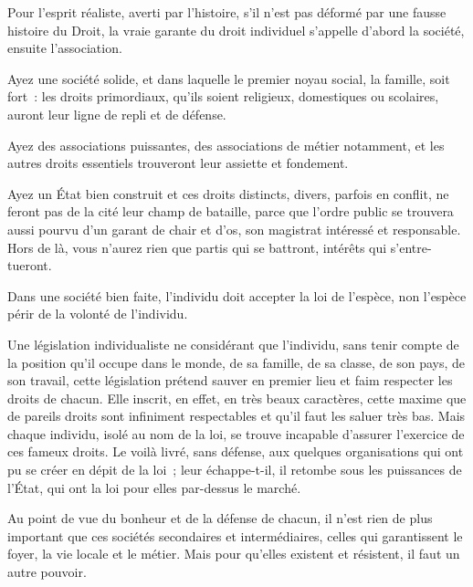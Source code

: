 \documentclass[french,twoside]{book} %
\newcommand{\astermono}{\medskip\centerline{\color{rubric}\large\selectfont{\syms ✻}}\medskip\par}%
\begin{document}
\astermono

\noindent Pour l’esprit réaliste, averti par l’histoire, s’il n’est pas déformé par une fausse histoire du Droit, la vraie garante du droit individuel s’appelle d’abord la société, ensuite l’association.\par
Ayez une société solide, et dans laquelle le premier noyau social, la famille, soit fort : les droits primordiaux, qu’ils soient religieux, domestiques ou scolaires, auront leur ligne de repli et de défense.\par
Ayez des associations puissantes, des associations de métier notamment, et les autres droits essentiels trouveront leur assiette et fondement.\par
Ayez un État bien construit et ces droits distincts, divers, parfois en conflit, ne feront pas de la cité leur champ de bataille, parce que l’ordre public se trouvera aussi pourvu d’un garant de chair et d’os, son magistrat intéressé et responsable. Hors de là, vous n’aurez rien que partis qui se battront, intérêts qui s’entre-tueront.\par

\astermono

\noindent Dans une société bien faite, l’individu doit accepter la loi de l’espèce, non l’espèce périr de la volonté de l’individu.\par

\astermono

\noindent Une législation individualiste ne considérant que l’individu, sans tenir compte de la position qu’il occupe dans le monde, de sa famille, de sa classe, de son pays, de son travail, cette législation prétend sauver en premier lieu et faim respecter les droits de chacun. Elle inscrit, en effet, en très beaux caractères, cette maxime que de pareils droits sont infiniment respectables et qu’il faut les saluer très bas. Mais chaque individu, isolé au nom de la loi, se trouve incapable d’assurer l’exercice de ces fameux droits. Le voilà livré, sans défense, aux quelques organisations qui ont pu se créer en dépit de la loi ; leur échappe-t-il, il retombe sous les puissances de l’État, qui ont la loi pour elles par-dessus le marché.\par

\astermono

\noindent Au point de vue du bonheur et de la défense de chacun, il n’est rien de plus important que ces sociétés secondaires et intermédiaires, celles qui garantissent le foyer, la vie locale et le métier. Mais pour qu’elles existent et résistent, il faut un autre pouvoir.\par
\end{document}
